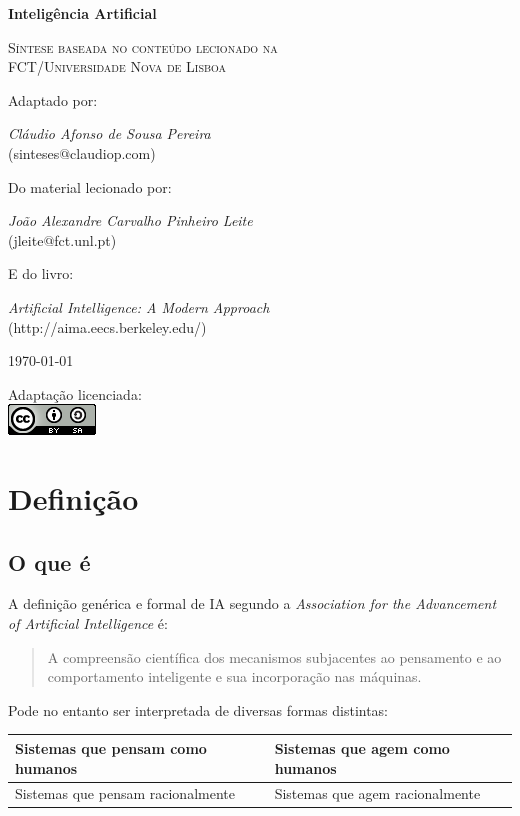 \documentclass[]{report}
\begin{document}
\begin{titlepage}
	\centering
	\vspace{5cm}
	{\huge\bfseries Inteligência Artificial\par}
	\vspace{1cm}
	{\scshape\Large Síntese baseada no conteúdo lecionado na\\
	 FCT/Universidade Nova de Lisboa\par}
	\vspace{2cm}
	Adaptado por:\\
	{\Large \textit{Cláudio Afonso de Sousa Pereira}\\
	(sinteses$\text{@}$claudiop$.$com)\par}
	\vspace{1cm}
	Do material lecionado por:\\
	{\Large \textit{João Alexandre Carvalho Pinheiro Leite}\\
	(jleite$\text{@}$fct$.$unl$.$pt)\par}
	\vspace{1cm}
	E do livro:\\
	{\Large \textit{Artificial Intelligence: A Modern Approach}\\
	(http://aima.eecs.berkeley.edu/)\par}
	\vspace{1cm}
	{\large \today\par}
	\vfill
	Adaptação licenciada:\\
	\href{http://creativecommons.org/licenses/by-sa/4.0/}{\includegraphics[scale=0.8]{../ccbysa.png}}
\end{titlepage}
\setcounter{tocdepth}{1}
\tableofcontents
\chapter{Definição}
\section{O que é}
A definição genérica e formal de IA segundo a \textit{Association for the Advancement of Artificial Intelligence} é:
\begin{quote}
A compreensão científica dos mecanismos subjacentes ao pensamento e ao comportamento inteligente e sua incorporação nas máquinas.
\end{quote}
Pode no entanto ser interpretada de diversas formas distintas:
\begin{table}[htbp]
	\begin{center}
\begin{tabular}{l | l}
Sistemas que pensam como humanos & Sistemas que agem como humanos \\ \hline
Sistemas que pensam racionalmente & Sistemas que agem racionalmente
\end{tabular}
\end{center}
\end{table}
\end{document}

